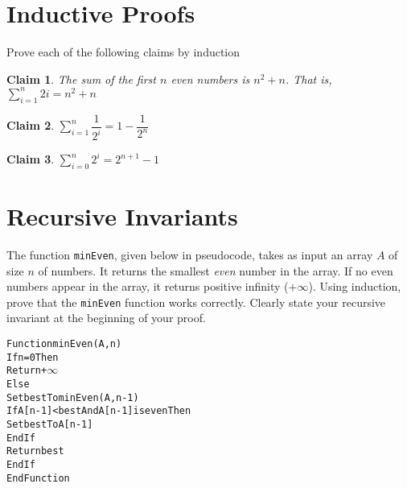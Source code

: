 \documentclass{article}
\newtheorem{claim}{Claim}
\begin{document}
    \section{Inductive Proofs}

    Prove each of the following claims by induction

    \begin{claim}
      The sum of the first $n$ even numbers is $n^2+n$.  That is, $\sum\limits_{i=1}^n 2i = n^2 + n$
    \end{claim}



    \begin{claim}
      $\sum\limits_{i=1}^{n} \dfrac{1}{2^i} = 1 - \dfrac{1}{2^n}$
    \end{claim}



    \begin{claim}
      $\sum\limits_{i=0}^{n} 2^i = 2^{n+1}-1$
    \end{claim}



    \vspace{1cm}
    \section{Recursive Invariants}
    
    The function \texttt{minEven}, given below in pseudocode, takes as
    input an array $A$ of size $n$ of numbers.  It returns the
    smallest \textit{even} number in the array.  If no even numbers
    appear in the array, it returns positive infinity ($+\infty$).
    Using induction, prove that the \texttt{minEven} function works
    correctly.  Clearly state your recursive invariant at the
    beginning of your proof.

    \begin{alltt}
Function minEven(A,n)
  If n = 0 Then
    Return +\ensuremath{\infty}
  Else
    Set best To minEven(A,n-1)
    If A[n-1] < best And A[n-1] is even Then
      Set best To A[n-1]
    EndIf
    Return best
  EndIf
EndFunction
    \end{alltt}

\end{document}
